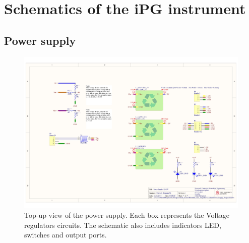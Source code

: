 \chapter{Schematics of the iPG instrument} 


\ifpdf
\graphicspath{{Appendix1/Figs/Raster/}{Appendix1/Figs/PDF/}{Appendix1/Figs/}}
\else
\graphicspath{{Appendix1/Figs/Vector/}{Appendix1/Figs/}}
\fi

\section*{Power supply}
\label{Appendix: Power Supply}
\begin{figure}[!htpb]
	\centering
	\includegraphics[width=0.55\paperwidth,keepaspectratio, angle=90]{power_supply_top}
	\caption[Top-up view of the power supply]{Top-up view of the power supply. Each box represents the Voltage regulators circuits. The schematic also includes indicators LED, switches and output ports.}
	\label{fig:schematic PS}
\end{figure}

